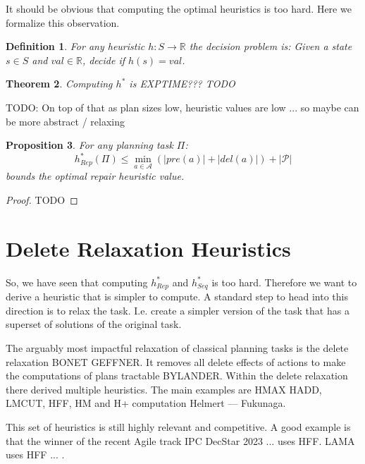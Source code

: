 \documentclass[twocolumn]{article}
\newcommand{\task}{\ensuremath{\Pi}\xspace}
\newcommand{\preds}{\ensuremath{\mathcal{P}}\xspace}
\newcommand{\acts}{\ensuremath{\mathcal{A}}\xspace}
\newcommand{\states}{\ensuremath{S}\xspace}
\newcommand{\someState}{\ensuremath{s}\xspace}
\newcommand{\prename}{\ensuremath{pre}\xspace}
\newcommand{\delname}{\ensuremath{del}\xspace}
\newcommand{\pre}[1]{\ensuremath{\prename(#1)}\xspace}
\newcommand{\del}[1]{\ensuremath{\delname(#1)}\xspace}
\newcommand{\arity}[1]{\ensuremath{|#1|}}
\newcommand{\someAct}{\ensuremath{a}\xspace}
\newcommand{\optimalHeuristic}{\ensuremath{h^{*}_{Rep}}\xspace}
\newcommand{\optimalHeuristicSeq}{\ensuremath{h^{*}_{Seq}}\xspace}
\newtheorem{theorem}{Theorem}
\newtheorem{proposition}[theorem]{Proposition}
\newtheorem{definition}[theorem]{Definition}
\begin{document}
	It should be obvious that computing the optimal heuristics is too hard. 
	Here we formalize this observation.
	
	\begin{definition}
		For any heuristic $h: \states \rightarrow \mathbb{R}$ the decision problem is:
		Given a state $\someState \in \states$ and $\mathit{val} \in \mathbb{R}$, decide if $h(\someState) = \mathit{val}$.
	\end{definition}
	
	\begin{theorem}
		Computing $h^*$ is EXPTIME??? TODO
	\end{theorem}
	
	
	TODO:
	On top of that as plan sizes low, heuristic values are low ... so maybe can be more 
	abstract / relaxing
	
	\begin{proposition}
		For any planning task \task:
		$$\optimalHeuristic(\task) \leq \min_{\someAct \in \acts}(\arity{\pre{\someAct}} + \arity{\del{\someAct}}) + \arity{\preds}$$
		bounds the optimal repair heuristic value.
	\end{proposition}
	
	\begin{proof}
		TODO
	\end{proof}
	
	
	\section{Delete Relaxation Heuristics}
	
	
	So, we have seen that computing \optimalHeuristic and \optimalHeuristicSeq is too hard.
	Therefore we want to derive a heuristic that is simpler to compute.
	A standard step to head into this direction is to relax the task.
	I.e. create a simpler version of the task that has a superset of solutions of the original task.
	
	The arguably most impactful relaxation of classical planning tasks is the delete relaxation BONET GEFFNER.
 	It removes all delete effects of actions to make the computations of plans tractable BYLANDER.
	Within the delete relaxation there derived multiple heuristics.
	The main examples are
	HMAX HADD, 
	LMCUT,
	HFF,
	HM
	and 
	H+ computation Helmert --- Fukunaga.
	
	
	This set of heuristics is still highly relevant and competitive.
	A good example is that the winner of the recent Agile track IPC 
	DecStar 2023 ... uses HFF.
	LAMA uses HFF ... .
	
\end{document}
